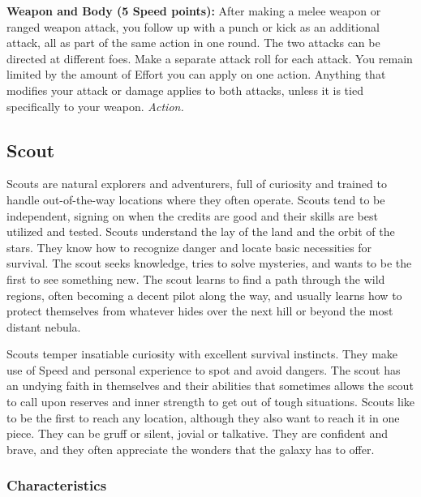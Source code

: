 \documentclass[a4paper,10pt,final,twocolumn,oneside]{book}
\newcommand{\itemAbility}[2]{\textcolor{25gray}{\textbullet\textbf{ #1:}}{ #2}\par}
\newcommand{\action}{\textit{ Action.}}
\begin{document}
\itemAbility{Weapon and Body (5 Speed points)}{After making a melee weapon or ranged weapon attack, you follow up with a punch or kick as an additional attack, all as part of the same action in one round. The two attacks can be directed at different foes. Make a separate attack roll for each attack. You remain limited by the amount of Effort you can apply on one action. Anything that modifies your attack or damage applies to both attacks, unless it is tied specifically to your weapon.\action}

\clearpage


%
%
%
%
%
%
%
%
%
%
%
%
%
%
%
%
%
%
%


\subsection{Scout} %
\label{sub:scout}

Scouts are natural explorers and adventurers, full of curiosity and trained to handle out-of-the-way locations where they often operate. Scouts tend to be independent, signing on when the credits are good and their skills are best utilized and tested. Scouts understand the lay of the land and the orbit of the stars. They know how to recognize danger and locate basic necessities for survival. The scout seeks knowledge, tries to solve mysteries, and wants to be the first to see something new. The scout learns to find a path through the wild regions, often becoming a decent pilot along the way, and usually learns how to protect themselves from whatever hides over the next hill or beyond the most distant nebula.

Scouts temper insatiable curiosity with excellent survival instincts. They make use of Speed and personal experience to spot and avoid dangers. The scout has an undying faith in themselves and their abilities that sometimes allows the scout to call upon reserves and inner strength to get out of tough situations. Scouts like to be the first to reach any location, although they also want to reach it in one piece. They can be gruff or silent, jovial or talkative. They are confident and brave, and they often appreciate the wonders that the galaxy has to offer.

\subsubsection*{Characteristics}
\label{subsub:scoutCharacteristics}
\end{document}
